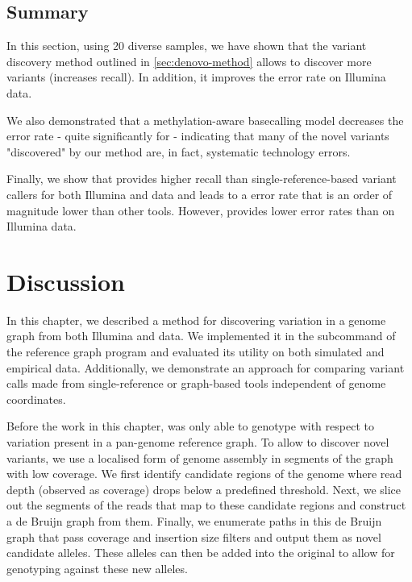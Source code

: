 \begin{figure}
        \label{fig:pandora-roc}
\end{figure}

\subsection{Summary}

In this section, using 20 diverse \ecoli{} samples, we have shown that the \denovo{} variant discovery method outlined in \autoref{sec:denovo-method} allows \pandora{} to discover more variants (increases recall). In addition, it improves the error rate on Illumina data.

We also demonstrated that a methylation-aware \ont{} basecalling model decreases the \pandora{} error rate - quite significantly for \denovo{} - indicating that many of the novel variants "discovered" by our method are, in fact, systematic technology errors.

Finally, we show that \pandora{} provides higher recall than single-reference-based variant callers for both Illumina and \ont{} data and leads to a \ont{} error rate that is an order of magnitude lower than other tools. However,  provides lower error rates than \pandora{} on Illumina data.

\section{Discussion}
\label{sec:denovo-discussion}

In this chapter, we described a method for discovering \denovo{} variation in a genome graph from both Illumina and \ont{} data. We implemented it in the  subcommand of the reference graph program \pandora{} and evaluated its utility on both simulated and empirical data. Additionally, we demonstrate an approach for comparing variant calls made from single-reference or graph-based tools independent of genome coordinates.

Before the work in this chapter, \pandora{} was only able to genotype with respect to variation present in a pan-genome reference graph. To allow \pandora{} to discover novel variants, we use a localised form of genome assembly in segments of the graph with low \kmer{} coverage. We first identify candidate regions of the genome where read depth (observed as \kmer{} coverage) drops below a predefined threshold. Next, we slice out the segments of the reads that map to these candidate regions and construct a de Bruijn graph from them. Finally, we enumerate paths in this de Bruijn graph that pass coverage and insertion size filters and output them as novel candidate alleles. These alleles can then be added into the original \panrg{} to allow for genotyping against these new alleles.

